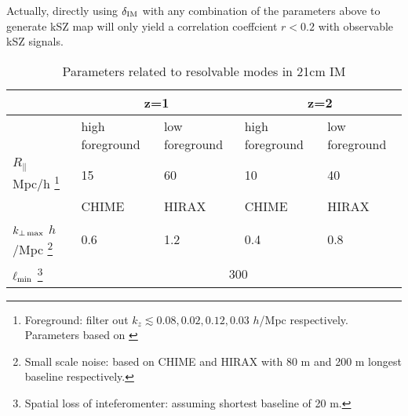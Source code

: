 Actually, directly using $\delta_\mathrm{IM}$ with any combination of the parameters above to generate kSZ map will only yield a correlation coeffcient $r<0.2$ with observable kSZ signals. 
\begin{table}
\begin{tabular}{|m{2cm}|m{1.5cm}|m{1.5cm}|m{1.5cm}|m{1.5cm}|}
    \hline
     & \multicolumn{2}{|c|}{z=1} &\multicolumn{2}{|c|}{z=2}\\
     \hline
     & high foreground &low foreground&high foreground& low foreground\\
     \cline{2-5}
     $R_\parallel$ Mpc/h
     \footnote{Foreground: filter out $k_z\lesssim 0.08,0.02,0.12,0.03$ $h$/Mpc respectively. Parameters based on \cite{2013ApJ...763L..20M,Switzer13,15Shaw}}
      & 15 & 60 & 10 & 40 \\
     \hline
     & CHIME & HIRAX & CHIME &HIRAX\\
     \cline{2-5}
     $k_{\perp\,\mathrm{max}}$ $h$/Mpc 
     \footnote{Small scale noise: based on CHIME\cite{2014CHIME} and HIRAX\cite{HIRAX} 
     with 80 m and 200 m longest baseline respectively.}
     & 0.6 & 1.2 & 0.4 & 0.8 \\
     \hline
     $\ell_\mathrm{min}$
     \footnote{Spatial loss of inteferomenter: assuming shortest baseline of 20 m.}
     & \multicolumn{4}{|c|}{300} \\
     \hline
\end{tabular}
     \caption{Parameters related to resolvable modes in 21cm IM}
     \label{tab:para}
\end{table}
